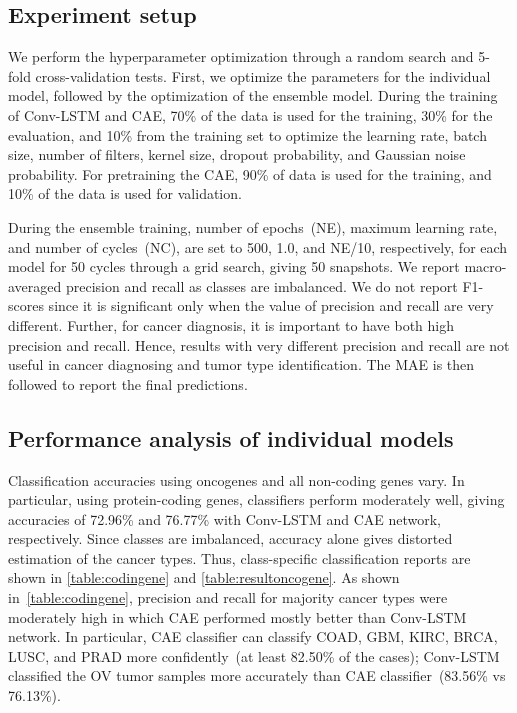 \subsection{Experiment setup}
We perform the hyperparameter optimization through a random search and 5-fold cross-validation tests. First, we optimize the parameters for the individual model, followed by the optimization of the ensemble model. During the training of Conv-LSTM and CAE, 70\% of the data is used for the training, 30\% for the evaluation, and 10\% from the training set to optimize the learning rate, batch size, number of filters, kernel size, dropout probability, and Gaussian noise probability. For pretraining the CAE, 90\% of data is used for the training, and 10\% of the data is used for validation. 

\hspace*{3.5mm} During the ensemble training, number of epochs~(NE), maximum learning rate, and number of cycles~(NC), are set to 500, 1.0, and NE/10, respectively, for each model for 50 cycles through a grid search, giving 50 snapshots. We report macro-averaged precision and recall as classes are imbalanced. We do not report F1-scores since it is significant only when the value of precision and recall are very different. Further, for cancer diagnosis, it is important to have both high precision and recall. Hence, results with very different precision and recall are not useful in cancer diagnosing and tumor type identification. The MAE is then followed to report the final predictions. 

\subsection{Performance analysis of individual models}
Classification accuracies using oncogenes and all non-coding genes vary. In particular, using protein-coding genes, classifiers perform moderately well, giving accuracies of 72.96\% and 76.77\% with Conv-LSTM and CAE network, respectively. Since classes are imbalanced, accuracy alone gives distorted estimation of the cancer types. Thus, class-specific classification reports are shown in \cref{table:codingene} and \cref{table:resultoncogene}. As shown in~\cref{table:codingene}, precision and recall for majority cancer types were moderately high in which CAE performed mostly better than Conv-LSTM network. In particular, CAE classifier can classify COAD, GBM, KIRC, BRCA, LUSC, and PRAD more confidently~(at least 82.50\% of the cases); Conv-LSTM classified the OV tumor samples more accurately than CAE classifier~(83.56\% vs 76.13\%). 

